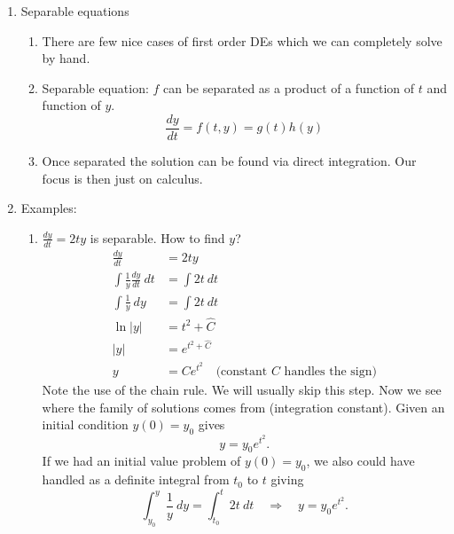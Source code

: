 \documentclass{article}
\newcommand{\ds}{\displaystyle}
\begin{document}
\begin{enumerate}

\item Separable equations
\begin{enumerate}
\item There are few nice cases of first order DEs which we can completely solve by hand. 
\item Separable equation: $f$ can be separated as a product of a function of $t$ and function of $y$.
\[
\frac{dy}{dt} = f(t,y)= g(t)h(y)
\]
\item Once separated the solution can be found via direct integration. Our focus is then just on calculus.
\end{enumerate}

\item Examples:
\begin{enumerate}
\item $\ds \frac{dy}{dt} = 2ty$ is separable. How to find $y$?
\begin{align*}
\frac{dy}{dt} &= 2ty \\
\int \frac{1}{y} \frac{dy}{dt} ~dt &= \int 2t ~dt \\
\int \frac{1}{y} ~dy &= \int 2t ~dt \\
\ln|y| &= t^2 + \hat{C} \\
|y| &= e^{t^2 + \hat{C}} \\
y &= Ce^{t^2} \quad \text{(constant $C$ handles the sign)}
\end{align*}
Note the use of the chain rule. We will usually skip this step. Now we see where the family of solutions comes from (integration constant). Given an initial condition $y(0)=y_0$ gives
\[
y = y_0 e^{t^2}.
\]
If we had an initial value problem of $y(0)=y_0$, we also could have handled as a definite integral from $t_0$ to $t$ giving
\[
\int_{y_0}^y \frac{1}{y} ~dy = \int_{t_0}^t 2t ~dt
\quad \Rightarrow \quad
y = y_0e^{t^2}.
\]


\end{enumerate}
\end{enumerate}
\end{document}
